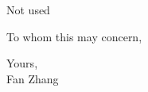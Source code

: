 \documentclass[11pt]{letter}
\begin{document}
\begin{letter}{Not used}

\opening{To whom this may concern,}

\lipsum[3-10]

Yours, \\[4em]
Fan Zhang

\end{letter}
\end{document}
